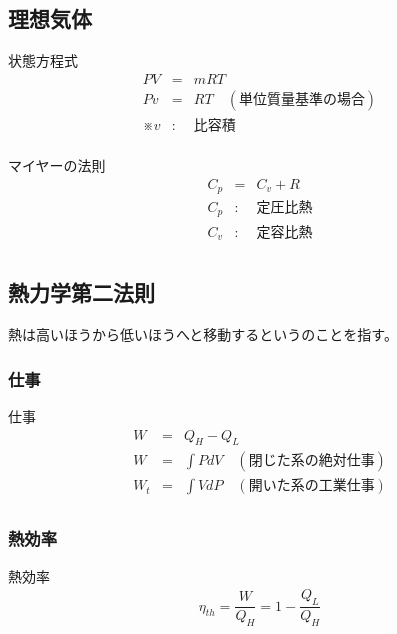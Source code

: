 \documentclass[a4paper]{jsarticle}
\begin{document}
\subsection{理想気体}
\begin{itembox}[l]{状態方程式}
    \begin{eqnarray*}
        PV&=&mRT\\
        Pv&=&RT\quad (単位質量基準の場合)\\
        ※v&:&比容積\\
    \end{eqnarray*}
\end{itembox}
\begin{itembox}[l]{マイヤーの法則}
    \begin{eqnarray*}
        C_p&=&C_v+R\\
        C_p&:&定圧比熱\\
        C_v&:&定容比熱\\
    \end{eqnarray*}
\end{itembox}
\subsection{熱力学第二法則}
\begin{center}
    熱は高いほうから低いほうへと移動するというのことを指す。
\end{center}
\subsubsection{仕事}
\begin{itembox}[l]{仕事}
    \begin{eqnarray*}
        W&=&Q_H-Q_L\\
        W&=&\displaystyle \int PdV\quad(閉じた系の絶対仕事)\\
        W_t&=&\displaystyle \int VdP\quad(開いた系の工業仕事) \\
    \end{eqnarray*}
\end{itembox}
\subsubsection{熱効率}
\begin{itembox}[l]{熱効率}
    \begin{eqnarray*}
        \eta_{th}=\dfrac{W}{Q_H}=1-\dfrac{Q_L}{Q_H}\\
    \end{eqnarray*}
\end{itembox}
\end{document}
